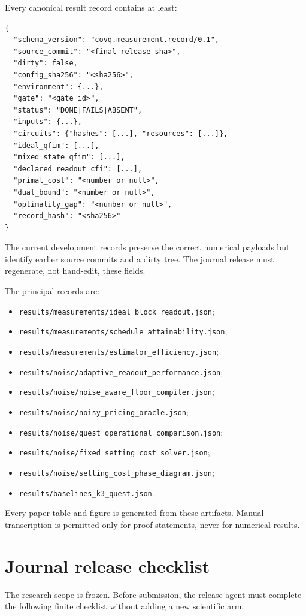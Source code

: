\documentclass[11pt]{article}
\theoremstyle{definition}
\theoremstyle{remark}
\begin{document}
Every canonical result record contains at least:
\begin{lstlisting}[style=covqcode,language={}]
{
  "schema_version": "covq.measurement.record/0.1",
  "source_commit": "<final release sha>",
  "dirty": false,
  "config_sha256": "<sha256>",
  "environment": {...},
  "gate": "<gate id>",
  "status": "DONE|FAILS|ABSENT",
  "inputs": {...},
  "circuits": {"hashes": [...], "resources": [...]},
  "ideal_qfim": [...],
  "mixed_state_qfim": [...],
  "declared_readout_cfi": [...],
  "primal_cost": "<number or null>",
  "dual_bound": "<number or null>",
  "optimality_gap": "<number or null>",
  "record_hash": "<sha256>"
}
\end{lstlisting}
The current development records preserve the correct numerical payloads but identify earlier source commits and a dirty tree. The journal release must regenerate, not hand-edit, these fields.

The principal records are:
\begin{itemize}
  \item \texttt{results/measurements/ideal\_block\_readout.json};
  \item \texttt{results/measurements/schedule\_attainability.json};
  \item \texttt{results/measurements/estimator\_efficiency.json};
  \item \texttt{results/noise/adaptive\_readout\_performance.json};
  \item \texttt{results/noise/noise\_aware\_floor\_compiler.json};
  \item \texttt{results/noise/noisy\_pricing\_oracle.json};
  \item \texttt{results/noise/quest\_operational\_comparison.json};
  \item \texttt{results/noise/fixed\_setting\_cost\_solver.json};
  \item \texttt{results/noise/setting\_cost\_phase\_diagram.json};
  \item \texttt{results/baselines\_k3\_quest.json}.
\end{itemize}
Every paper table and figure is generated from these artifacts. Manual transcription is permitted only for proof statements, never for numerical results.

\section{Journal release checklist}
\label{app:release-checklist}

The research scope is frozen. Before submission, the release agent must complete the following finite checklist without adding a new scientific arm.
\end{document}
